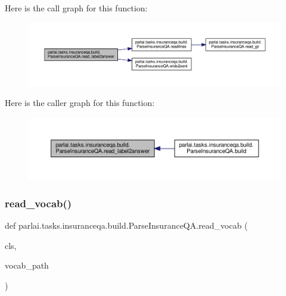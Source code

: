 Here is the call graph for this function\+:
\nopagebreak
\begin{figure}[H]
\begin{center}
\leavevmode
\includegraphics[width=350pt]{classparlai_1_1tasks_1_1insuranceqa_1_1build_1_1ParseInsuranceQA_a24c20a520141dbc602a242780281ee6d_cgraph}
\end{center}
\end{figure}
Here is the caller graph for this function\+:
\nopagebreak
\begin{figure}[H]
\begin{center}
\leavevmode
\includegraphics[width=350pt]{classparlai_1_1tasks_1_1insuranceqa_1_1build_1_1ParseInsuranceQA_a24c20a520141dbc602a242780281ee6d_icgraph}
\end{center}
\end{figure}
\mbox{\label{classparlai_1_1tasks_1_1insuranceqa_1_1build_1_1ParseInsuranceQA_ade9a2ccdc949872bb85c31c9440d5e82}} 
\subsubsection{\texorpdfstring{read\+\_\+vocab()}{read\_vocab()}}
{\footnotesize\ttfamily def parlai.\+tasks.\+insuranceqa.\+build.\+Parse\+Insurance\+Q\+A.\+read\+\_\+vocab (\begin{DoxyParamCaption}\item[{}]{cls,  }\item[{}]{vocab\+\_\+path }\end{DoxyParamCaption})}




